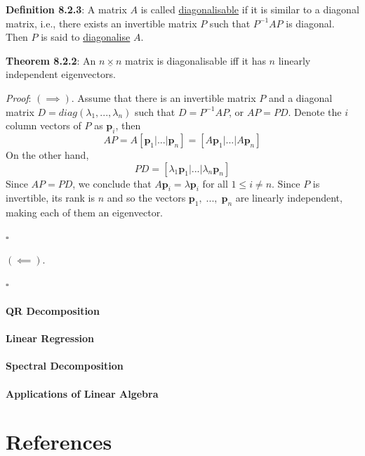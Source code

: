 \documentclass{article}
\newcommand{\separate}[1] {\vspace{#1 pt}\noindent}
\newcommand{\definition}[2]{\textbf{Definition #1}: #2\label{def:#1}}
\newcommand{\proof}[2]{\textit{Proof}: #2 \begin{flushright}\(\square\)\end{flushright}\label{prf:#1}}
\newcommand{\theorem}[3]{\textbf{Theorem #1}: #2 \par\separate{3}\proof{thm:#1}{#3}\label{thm:#1}}
\begin{document}
\separate{7}\definition{8.2.3}{A matrix \(A\) is called \underline{diagonalisable} if it is similar to a diagonal matrix, i.e., there exists an invertible matrix \(P\) such that \(P^{-1}AP\) is diagonal. Then \(P\) is said to \underline{diagonalise} \(A\).}

\newpage\noindent\theorem{8.2.2}{An \(\underline{n \times n}\) matrix is diagonalisable iff it has \(n\) linearly independent eigenvectors.}
{\((\implies).\) Assume that there is an invertible matrix \(P\) and a diagonal matrix \(D = diag(\lambda_1,...,\lambda_n)\) such that \(D=P^{-1}AP\), or \(AP=PD\). Denote the \(i\) column vectors of \(P\) as \(\mathbf{p}_i\), then
\begin{equation}
    AP = A[\mathbf{p}_1|...|\mathbf{p}_n] = [A\mathbf{p}_1|...|A\mathbf{p}_n]
\end{equation}
On the other hand, 
\begin{equation}
    PD = [\lambda_1\mathbf{p}_1|...|\lambda_n\mathbf{p}_n]
\end{equation}
Since \(AP=PD\), we conclude that \(A\mathbf{p}_i = \lambda\mathbf{p}_i\) for all \(1 \leq i \neq n\). Since \(P\) is invertible, its rank is \(n\) and so the vectors \(\mathbf{p}_1,\;...,\;\mathbf{p}_n\) are linearly independent, making each of them an eigenvector.\begin{flushright}\(\square\)\end{flushright}

\separate{7}\((\impliedby).\)
}

\subsection{QR Decomposition}

\subsection{Linear Regression}

\subsection{Spectral Decomposition}

\subsection{Applications of Linear Algebra}

\newpage\part{References}
\end{document}
